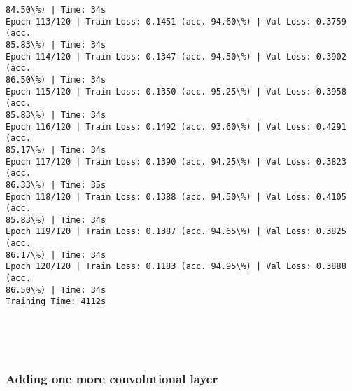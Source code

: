 \documentclass[8pt]{extarticle}
\begin{document}
\begin{Verbatim}[commandchars=\\\{\}]
84.50\%) | Time: 34s
Epoch 113/120 | Train Loss: 0.1451 (acc. 94.60\%) | Val Loss: 0.3759 (acc.
85.83\%) | Time: 34s
Epoch 114/120 | Train Loss: 0.1347 (acc. 94.50\%) | Val Loss: 0.3902 (acc.
86.50\%) | Time: 34s
Epoch 115/120 | Train Loss: 0.1350 (acc. 95.25\%) | Val Loss: 0.3958 (acc.
85.83\%) | Time: 34s
Epoch 116/120 | Train Loss: 0.1492 (acc. 93.60\%) | Val Loss: 0.4291 (acc.
85.17\%) | Time: 34s
Epoch 117/120 | Train Loss: 0.1390 (acc. 94.25\%) | Val Loss: 0.3823 (acc.
86.33\%) | Time: 35s
Epoch 118/120 | Train Loss: 0.1388 (acc. 94.50\%) | Val Loss: 0.4105 (acc.
85.83\%) | Time: 34s
Epoch 119/120 | Train Loss: 0.1387 (acc. 94.65\%) | Val Loss: 0.3825 (acc.
86.17\%) | Time: 34s
Epoch 120/120 | Train Loss: 0.1183 (acc. 94.95\%) | Val Loss: 0.3888 (acc.
86.50\%) | Time: 34s
Training Time: 4112s
    \end{Verbatim}

    \begin{center}
    \end{center}
    { \hspace*{\fill} \\}
    
    \begin{center}
    \end{center}
    { \hspace*{\fill} \\}
    
    \subsubsection{Adding one more convolutional
layer}\label{adding-one-more-convolutional-layer}
\end{document}
